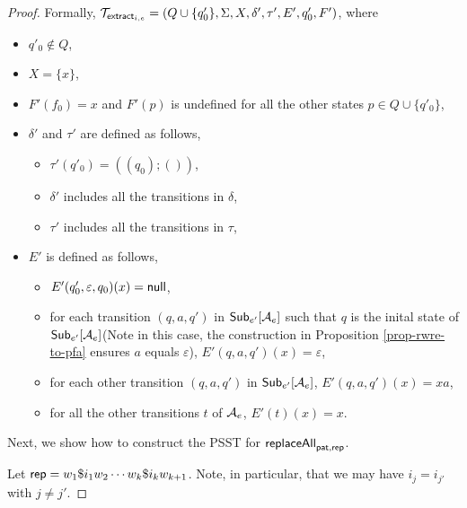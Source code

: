 \begin{proof}
        Formally, $\mathcal{T}_{\mathsf{extract}_{i,e}} = (Q \cup \{q'_0\}, \Sigma, X, \delta', \tau', E', q'_0, F')$, where
        \begin{itemize}
            \item $q'_0 \not \in Q$,
            \item $X = \{x\}$,
            \item $F'(f_0)= x$ and $F'(p)$ is undefined for all the other states $p \in Q  \cup \{q'_0\}$,
            \item $\delta'$ and $\tau'$ are defined as follows,
                \begin{itemize}
                    \item $\tau'(q'_0) = ((q_0); ())$,
                    \item $\delta'$ includes all the transitions in $\delta$,
                    \item $\tau'$ includes all the transitions in $\tau$,
                \end{itemize}
            \item $E'$ is defined as follows,
                \begin{itemize}
                    \item $E'(q'_0, \varepsilon, q_0)(x) = \mathsf{null}$,
                    \item for each transition $(q, a, q')$ in ${\sf Sub}_{e'}[\mathcal{A}_e]$ such that $q$ is the inital state of ${\sf Sub}_{e'}[\mathcal{A}_e]$(Note in this case, the construction in Proposition \ref{prop-rwre-to-pfa} ensures $a$ equals $\varepsilon$), $E'(q, a, q')(x) = \varepsilon$,
                    \item for each other transition $(q, a, q')$ in ${\sf Sub}_{e'}[\mathcal{A}_e]$, $E'(q, a, q')(x) = x a$,

                    \item for all the other transitions $t$ of $\mathcal{A}_e$, $E'(t)(x) = x$.
                \end{itemize}
        \end{itemize}

        Next, we show how to construct the PSST for $\mathsf{replaceAll}_{\mathsf{pat}, \mathsf{rep}}$.

        Let $\mathsf{rep} = w_1 \$i_1 w_2 \cdots w_k \$i_k w_{k+1}$.
        Note, in particular, that we may have $i_j = i_{j'}$ with $j \neq j'$.


\end{proof}
